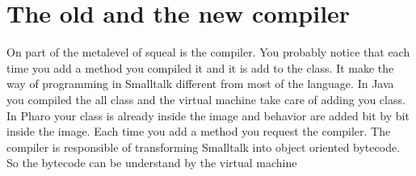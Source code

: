 \documentclass[a4paper,10pt,twoside]{book}
\begin{document}
	\renewcommand{\nnbb}[2]{} %
	\sloppy
\fi
\chapter{The old and the new compiler}

On part of the metalevel of squeal is the compiler. 
You probably notice that each time you add a method you compiled it and it is add to the class.
It make the way of programming in Smalltalk different from most of the language.
In Java you compiled the all class and the virtual machine take care of adding you class.
In Pharo your class is already inside the image and behavior are added bit by bit inside the image.
Each time you add a method you request the compiler.
The compiler is responsible of transforming Smalltalk into object oriented bytecode. 
So the bytecode can be understand by the virtual machine


\ifx\wholebook\relax\else
   
   
\end{document}
